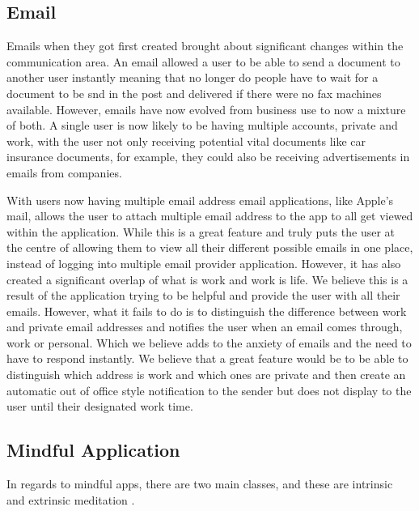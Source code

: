 \documentclass{sigchi}
\begin{document}
		\subsection{Email}
		Emails when they got first created brought about significant changes within the communication area. An email allowed a user to be able to send a document to another user instantly meaning that no longer do people have to wait for a document to be snd in the post and delivered if there were no fax machines available. However, emails have now evolved from business use to now a mixture of both. A single user is now likely to be having multiple accounts, private and work, with the user not only receiving potential vital documents like car insurance documents, for example, they could also be receiving advertisements in emails from companies.
		
		With users now having multiple email address email applications, like Apple's mail, allows the user to attach multiple email address to the app to all get viewed within the application. While this is a great feature and truly puts the user at the centre of allowing them to view all their different possible emails in one place, instead of logging into multiple email provider application. However, it has also created a significant overlap of what is work and work is life. We believe this is a result of the application trying to be helpful and provide the user with all their emails. However, what it fails to do is to distinguish the difference between work and private email addresses and notifies the user when an email comes through, work or personal. Which we believe adds to the anxiety of emails and the need to have to respond instantly.  We believe that a great feature would be to be able to distinguish which address is work and which ones are private and then create an automatic out of office style notification to the sender but does not display to the user until their designated work time.
		
		\subsection{Mindful Application}
			
			In regards to mindful apps, there are two main classes, and these are intrinsic and extrinsic meditation \cite{dauden2018evaluating}. 
			
\end{document}

